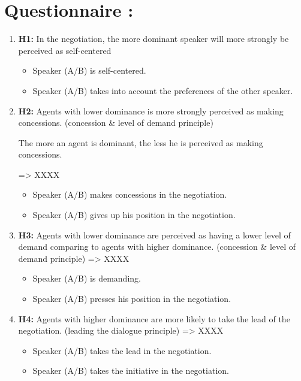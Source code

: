 \documentclass{article}
\begin{document}
	\section{Questionnaire :}
	
	
		\begin{enumerate}
			

		\item  \textbf{H1:} In the negotiation, the more dominant speaker will more strongly be perceived as self-centered
				\begin{itemize}
				\item Speaker (A/B) is self-centered.
				\item Speaker (A/B) takes into account the preferences of the other speaker. 
					\end{itemize}  
		
		\item \textbf{H2:} Agents with lower dominance is more strongly perceived as making concessions. (concession \& level of demand principle)
		
			The more an agent is dominant, the less he is perceived as making concessions.
			
			=> XXXX
				\begin{itemize}
						\item Speaker (A/B) makes concessions in the negotiation.
						\item Speaker (A/B) gives up his position in the negotiation.
				\end{itemize} 
				
				
		\item \textbf{H3:} Agents with lower dominance are perceived as having a lower level of demand comparing to agents with higher dominance. (concession \& level of demand principle)
		=> XXXX
				\begin{itemize}
						\item Speaker (A/B) is demanding.
						\item Speaker (A/B) presses his position in the negotiation.
				\end{itemize} 
				
				
		\item \textbf{H4:} Agents with higher dominance are more likely to take the lead of the negotiation. (leading the dialogue principle)
		=> XXXX
		\begin{itemize}
				\item Speaker (A/B) takes the lead in the negotiation.
				\item Speaker (A/B) takes the initiative in the negotiation. 
		\end{itemize}
		

\end{enumerate}
\end{document}
